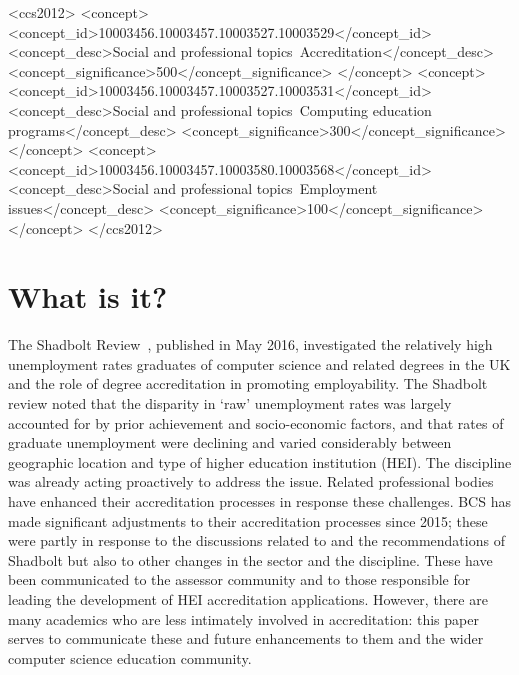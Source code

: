 \documentclass[sigconf]{acmart}
\begin{document}
 \begin{CCSXML}
<ccs2012>
<concept>
<concept_id>10003456.10003457.10003527.10003529</concept_id>
<concept_desc>Social and professional topics~Accreditation</concept_desc>
<concept_significance>500</concept_significance>
</concept>
<concept>
<concept_id>10003456.10003457.10003527.10003531</concept_id>
<concept_desc>Social and professional topics~Computing education programs</concept_desc>
<concept_significance>300</concept_significance>
</concept>
<concept>
<concept_id>10003456.10003457.10003580.10003568</concept_id>
<concept_desc>Social and professional topics~Employment issues</concept_desc>
<concept_significance>100</concept_significance>
</concept>
</ccs2012>
\end{CCSXML}




\maketitle

\section {What is it?}

The Shadbolt Review~\cite{shadbolt2016shadbolt}, published in May
2016, investigated the relatively high unemployment rates graduates of
computer science and related degrees in the UK and the role of degree
accreditation in promoting employability. The Shadbolt review noted
that the disparity in `raw' unemployment rates was largely accounted
for by prior achievement and socio-economic factors, and that rates of
graduate unemployment were declining and varied considerably between
geographic location and type of higher education institution
(HEI). The discipline was already acting proactively to address the
issue.  Related professional bodies have enhanced their accreditation
processes in response these challenges. BCS has made significant
adjustments to their accreditation processes since 2015; these were
partly in response to the discussions related to and the
recommendations of Shadbolt but also to other changes in the sector
and the discipline.  These have been communicated to the assessor
community and to those responsible for leading the development of HEI
accreditation applications. However, there are many academics who are
less intimately involved in accreditation: this paper serves to
communicate these and future enhancements to them and the wider
computer science education community.
\end{document}

